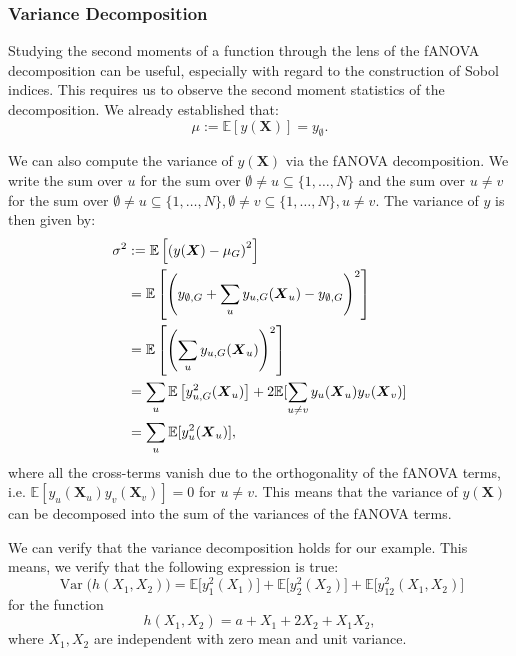 \subsubsection{Variance Decomposition}
Studying the second moments of  a function through the lens of the fANOVA decomposition can be useful, especially with regard to the construction of Sobol indices. This requires us to observe the second moment statistics of the decomposition. We already established that:
$$ \mu := \mathbb{E}[y(\boldsymbol{X})] = y_{\emptyset}.$$

We can also compute the variance of $y(\boldsymbol{X})$ via the fANOVA decomposition.
We write the sum over $u$ for the sum over $\emptyset \neq u \subseteq \{1, \dots, N\}$ and the sum over $u \neq v$ for the sum over $\emptyset \neq u \subseteq \{1, \dots, N\}, \emptyset \neq v \subseteq \{1, \dots, N\}, u \neq v$.
The variance of $y$ is then given by:
\begin{align*}
\sigma^2 
&:= \mathbb{E}\left[ \left( y(\boldsymbol{X}) - \mu_G \right)^2 \right] \notag \\
&= \mathbb{E} \left[ \left( y_{\emptyset,G} + \sum_{u} y_{u,G}(\boldsymbol{X}_u) - y_{\emptyset,G} \right)^2 \right] \notag \\
&= \mathbb{E} \left[ \left( \sum_{u} y_{u,G}(\boldsymbol{X}_u) \right)^2 \right] \notag \\
&= \sum_{u} \mathbb{E} \left[ y_{u,G}^2(\boldsymbol{X}_u) \right]
+ 2 \mathbb{E}[\sum_{u \neq v} y_u({\boldsymbol{X}_u})  y_v({\boldsymbol{X}_v})] \\
    & = \sum_{u} \mathbb{E}[y_u^2({\boldsymbol{X}_u})],
\end{align*}
where all the cross-terms vanish due to the orthogonality of the fANOVA terms, i.e. $\mathbb{E}[y_u({\boldsymbol{X}_u})  y_v({\boldsymbol{X}_v})] = 0$ for $u \neq v$.
This means that the variance of $y(\boldsymbol{X})$ can be decomposed into the sum of the variances of the fANOVA terms.\par

We can verify that the variance decomposition holds for our example. This means, we verify that the following expression is true:
\[
  \operatorname{Var}\big(h(X_1,X_2)\big)
  = \mathbb{E}\big[y_1^2(X_1)\big]
  + \mathbb{E}\big[y_2^2(X_2)\big]
  + \mathbb{E}\big[y_{12}^2(X_1,X_2)\big]
\]
for the function
\[
  h(X_1,X_2) = a + X_1 + 2X_2 + X_1 X_2 ,
\]
where $X_1,X_2$ are independent with zero mean and unit variance.

